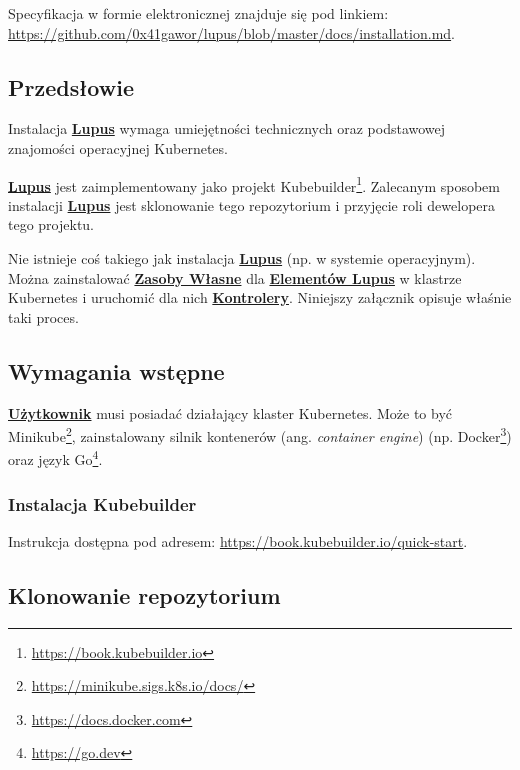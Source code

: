 \label{appendix:2}

Specyfikacja w formie elektronicznej znajduje się pod linkiem: \url{https://github.com/0x41gawor/lupus/blob/master/docs/installation.md}.

\subsection{Przedsłowie}

Instalacja \hyperlink{def:lupus}{\textbf{Lupus}} wymaga umiejętności technicznych oraz podstawowej znajomości operacyjnej Kubernetes.

\hyperlink{def:lupus}{\textbf{Lupus}} jest zaimplementowany jako projekt Kubebuilder\footnote{\url{https://book.kubebuilder.io}}. Zalecanym sposobem instalacji \hyperlink{def:lupus}{\textbf{Lupus}} jest sklonowanie tego repozytorium i przyjęcie roli dewelopera tego projektu.

Nie istnieje coś takiego jak instalacja \hyperlink{def:lupus}{\textbf{Lupus}} (np. w systemie operacyjnym). Można zainstalować \hyperlink{def:zasoby-wlasne}{\textbf{Zasoby Własne}} dla \hyperlink{def:element-lupus}{\textbf{Elementów Lupus}} w klastrze Kubernetes i uruchomić dla nich \hyperlink{def:operator-zasobu-element}{\textbf{Kontrolery}}. Niniejszy załącznik opisuje właśnie taki proces.

\subsection{Wymagania wstępne}

\hyperlink{def:uzytkownik}{\textbf{Użytkownik}} musi posiadać działający klaster Kubernetes. Może to być Minikube\footnote{\url{https://minikube.sigs.k8s.io/docs/}}, zainstalowany silnik kontenerów (ang. \textit{container engine}) (np. Docker\footnote{\url{https://docs.docker.com}}) oraz język Go\footnote{\url{https://go.dev}}.

\subsubsection{Instalacja Kubebuilder}

Instrukcja dostępna pod adresem: \url{https://book.kubebuilder.io/quick-start}.

\subsection{Klonowanie repozytorium}

